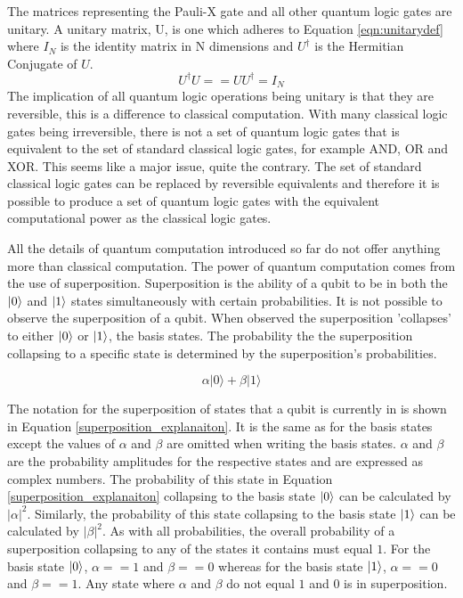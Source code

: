 The matrices representing the Pauli-X gate and all other quantum logic gates are unitary.
A unitary matrix, U, is one which adheres to Equation \ref{eqn:unitarydef} where $I_N$ is the identity matrix in N dimensions and $U^{\dagger}$ is the Hermitian Conjugate of $U$.
\begin{equation}
\label{eqn:unitarydef}
U^{\dagger}
U == UU^{\dagger} = I_N
\end{equation}
The implication of all quantum logic operations being unitary is that they are reversible, this is a difference to classical computation.
With many classical logic gates being irreversible, there is not a set of quantum logic gates that is equivalent to the set of standard classical logic gates, for example AND, OR and XOR.
This seems like a major issue, quite the contrary.
The set of standard classical logic gates can be replaced by reversible equivalents and therefore it is possible to produce a set of quantum logic gates with the equivalent computational power as the classical logic gates.

All the details of quantum computation introduced so far do not offer anything more than classical computation.
The power of quantum computation comes from the use of superposition.
Superposition is the ability of a qubit to be in both the $\left\vert{0}\right\rangle$ and $\left\vert{1}\right\rangle$ states simultaneously with certain probabilities.
It is not possible to observe the superposition of a qubit.
When observed the superposition 'collapses' to either $\left\vert{0}\right\rangle$ or $\left\vert{1}\right\rangle$, the basis states.
The probability the the superposition collapsing to a specific state is determined by the superposition's probabilities.

\begin{equation}
\label{superposition_explanaiton}
\alpha\vert0\rangle+\beta\vert1\rangle
\end{equation}

The notation for the superposition of states that a qubit is currently in is shown in Equation \ref{superposition_explanaiton}.
It is the same as for the basis states except the values of $\alpha$ and $\beta$ are omitted when writing the basis states.
$\alpha$ and $\beta$ are the probability amplitudes for the respective states and are expressed as complex numbers.
The probability of this state in Equation \ref{superposition_explanaiton} collapsing to the basis state $\left\vert{0}\right\rangle$ can be calculated by $\vert\alpha\vert^2$.
Similarly, the probability of this state collapsing to the basis state $\left\vert{1}\right\rangle$ can be calculated by $\vert\beta\vert^2$.
As with all probabilities, the overall probability of a superposition collapsing to any of the states it contains must equal $1$.
For the basis state $\left\vert{0}\right\rangle$, $\alpha==1$ and $\beta==0$ whereas for the basis state $\left\vert{1}\right\rangle$, $\alpha==0$ and $\beta==1$.
Any state where $\alpha$ and $\beta$ do not equal $1$ and $0$ is in superposition.

